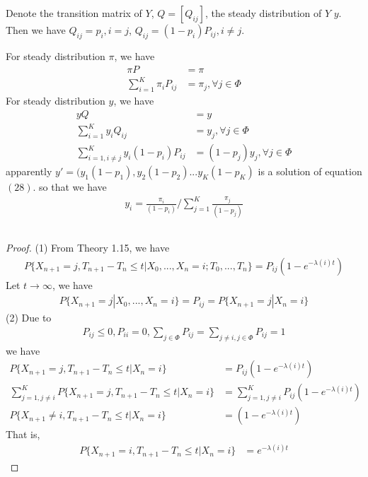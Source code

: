 \documentclass[runningheads]{llncs}
\begin{document}
    \subsection{}
    Denote the transition matrix of $Y$, $Q = [Q_{ij}]$,
    the steady distribution of $Y$ $y$.
    Then we have $Q_{ij} = p_i, i = j$, $Q_{ij} = (1 - p_i)P_{ij}, i \neq j$.
    \par
    For steady distribution $\pi$, we have
    \begin{align}
        \pi P &= \pi \\
        \sum_{i=1}^K \pi_i P_{ij} &= \pi_j, \forall j \in \Phi
    \end{align}
    For steady distribution $y$, we have
    \begin{align}
        y Q &= y \\
        \sum_{i=1}^K y_i Q_{ij} &= y_j, \forall j \in \Phi \\
        \sum_{i=1, i \neq j}^K y_i (1 - p_i)P_{ij}
         &= (1 - p_j) y_j, \forall j \in \Phi 
    \end{align}
    apparently $y' = (y_1(1 - p_1), y_2(1 - p_2)...y_K(1 - p_K)$
    is a solution of equation $(28)$.
    so that we have
    \begin{align}
        y_i = \frac{\pi_i}{(1-p_i)} / \sum_{j = 1}^K \frac{\pi_j}{(1-p_j)}
    \end{align}
    \subsection{}
    \begin{proof}
        (1) From Theory 1.15, we have
        \begin{align}
            P \{ X_{n+1} = j, T_{n+1} - T_n \leq t | X_0, ..., X_n = i; T_0,...,T_n \}
             = P_{ij} (1 - e^{-\lambda(i) t})
        \end{align}
        Let $t \rightarrow \infty$, we have
        \begin{align}
            P \{ X_{n+1} = j | X_0,..., X_n = i \} = P_{ij} = P \{ X_{n+1} = j | X_n = i \}
        \end{align}
        (2) 
        Due to
        \begin{align}
            P_{ij} \leq 0, P_{ii} = 0, \sum_{j \in \Phi} P_{ij} = \sum_{j \neq i, j \in \Phi} P_{ij} = 1
        \end{align}
        we have
        \begin{align}
            P \{ X_{n+1} = j, T_{n+1} - T_n \leq t | X_n = i \}
            &= P_{ij} (1 - e^{-\lambda(i) t}) \\
            \sum_{j=1, j \neq i}^K P \{ X_{n+1} = j, T_{n+1} - T_n \leq t | X_n = i\}
            &= \sum_{j=1, j \neq i}^K P_{ij} (1 - e^{-\lambda(i) t}) \\
            P \{ X_{n+1} \neq i, T_{n+1} - T_n \leq t | X_n = i\}
            &= (1 - e^{-\lambda(i) t})
        \end{align}
        That is,
        \begin{align}
            P \{ X_{n+1} = i, T_{n+1} - T_n \leq t | X_n = i\}
            &= e^{-\lambda(i) t}
        \end{align}
    \end{proof}
\end{document}
